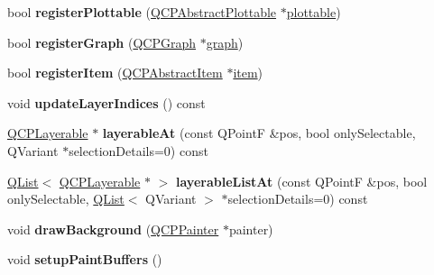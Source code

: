 \begin{DoxyCompactItemize}
\item 
\mbox{\label{class_q_custom_plot_aeba7733bb9fadfb5a375b3f40de9e58a}} 
bool {\bfseries register\+Plottable} (\hyperlink{class_q_c_p_abstract_plottable}{Q\+C\+P\+Abstract\+Plottable} $\ast$\hyperlink{class_q_custom_plot_a32de81ff53e263e785b83b52ecd99d6f}{plottable})
\item 
\mbox{\label{class_q_custom_plot_acfc01230bddaea4f1782e4aa7d130af6}} 
bool {\bfseries register\+Graph} (\hyperlink{class_q_c_p_graph}{Q\+C\+P\+Graph} $\ast$\hyperlink{class_q_custom_plot_a6ecae130f684b25276fb47bd3a5875c6}{graph})
\item 
\mbox{\label{class_q_custom_plot_afbd4010b2e3f364c8d512691b2a1640a}} 
bool {\bfseries register\+Item} (\hyperlink{class_q_c_p_abstract_item}{Q\+C\+P\+Abstract\+Item} $\ast$\hyperlink{class_q_custom_plot_ac042f2e78edd228ccf2f26b7fe215239}{item})
\item 
\mbox{\label{class_q_custom_plot_a7f1ca67a66d37b6d260a0b93de08f3bd}} 
void {\bfseries update\+Layer\+Indices} () const
\item 
\mbox{\label{class_q_custom_plot_a36bb3ef3714173504c0ffedb206ceb86}} 
\hyperlink{class_q_c_p_layerable}{Q\+C\+P\+Layerable} $\ast$ {\bfseries layerable\+At} (const Q\+PointF \&pos, bool only\+Selectable, Q\+Variant $\ast$selection\+Details=0) const
\item 
\mbox{\label{class_q_custom_plot_a400acf37a638495a13f91f5e0d62ae97}} 
\hyperlink{class_q_list}{Q\+List}$<$ \hyperlink{class_q_c_p_layerable}{Q\+C\+P\+Layerable} $\ast$ $>$ {\bfseries layerable\+List\+At} (const Q\+PointF \&pos, bool only\+Selectable, \hyperlink{class_q_list}{Q\+List}$<$ Q\+Variant $>$ $\ast$selection\+Details=0) const
\item 
\mbox{\label{class_q_custom_plot_a05dd52438cee4353b18c1e53a439008d}} 
void {\bfseries draw\+Background} (\hyperlink{class_q_c_p_painter}{Q\+C\+P\+Painter} $\ast$painter)
\item 
\mbox{\label{class_q_custom_plot_a2685341f7242c3882f4cc5e379308d71}} 
void {\bfseries setup\+Paint\+Buffers} ()

\end{DoxyCompactItemize}
